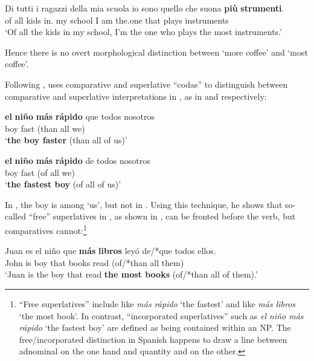\documentclass[output=paper
,modfonts
,nonflat]{langsci/langscibook}
\begin{document}
\ea \label{ex:coppockstrand:66}
\gll Di tutti i ragazzi della mia scuola io sono quello che suona \textbf{più} \textbf{strumenti}.\\
of all  kids in. my school I am the.one that plays \cmpr{} instruments\\ 
\glt `Of all the kids in my school, I'm the one who plays the most instruments.'
\z

Hence there is no overt morphological distinction between `more coffee' and `most coffee'.

Following \citet{BosqueBrucart1991}, \citet{Rohena-Madrazo2007} uses comparative and superlative ``codas'' to distinguish between comparative and superlative interpretations in , as in  and  respectively:

\ea \label{ex:coppockstrand:67}
\gll \textbf{el} \textbf{ni\~no} \textbf{m\'as} \textbf{r\'apido} {\op}que todos nosotros{\cp}\\
 boy \cmpr{} fast (than all we)\\ 
\glt `\textbf{the boy faster} (than all of us)'
\z

\ea \label{ex:coppockstrand:68}
\gll \textbf{el} \textbf{ni\~no} \textbf{m\'as} \textbf{r\'apido} {\op}de todos nosotros{\cp}\\
 boy \cmpr{} fast (of all we)\\ 
\glt `\textbf{the fastest boy} (of all of us)'
\z

In , the boy is among `us', but not in . Using this technique, he shows that so-called ``free'' superlatives in , as shown in , can be fronted before the verb, but comparatives cannot:\footnote{``Free superlatives'' include  like \textit{m\'as r\'apido} `the fastest' and  like \textit{m\'as libros} `the most book'. In contrast, ``incorporated superlatives'' such as \textit{el ni\~no m\'as r\'apido} `the fastest boy' are defined as being contained within an NP. The free/incorporated distinction in Spanish happens to draw a line between adnominal  on the one hand and quantity and  on the other.}

\ea \label{ex:coppockstrand:69}
\gll Juan es el ni\~no que \textbf{m\'as} \textbf{libros} ley\'o {\op}de\textnormal{/*}que todos ellos{\cp}.\\
John is  boy that \cmpr{} books read (of/*than all them)\\ 
\glt `Juan is the boy that read \textbf{the most books} (of/*than all of them).'
\z
\end{document}
